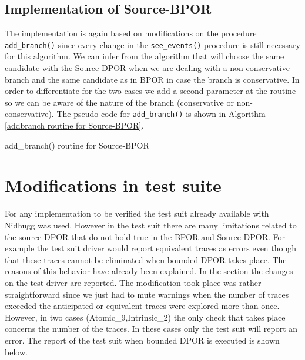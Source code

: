 \subsection{Implementation of Source-BPOR}
The implementation is again based on modifications on the procedure \verb|add_branch()| since every change in the \verb|see_events()| procedure is still necessary for this algorithm.
We can infer from the algorithm that will choose the same candidate with the Source-DPOR when we are dealing with a non-conservative branch and the same candidate as in BPOR
in case the branch is conservative. In order to differentiate for the two cases we add a second parameter at the routine so we can be aware of the nature of the
branch (conservative or non-conservative). The pseudo code for \verb|add_branch()| is shown in Algorithm \ref{addbranch routine for Source-BPOR}.

\begin{algorithm}[H]
    \caption{add\_branch() routine for Source-BPOR}
    \label{addbranch routine for Source-BPOR}
\end{algorithm}

\section{Modifications in test suite}
For any implementation to be verified the test suit already available with Nidhugg was used. However in the test suit there are many limitations related to the source-DPOR
that do not hold true in the BPOR and Source-DPOR. For example the test suit driver would report equivalent traces as errors even though that these traces cannot be eliminated 
when bounded DPOR takes place. The reasons of this behavior have already been explained. In the section the changes on the test driver are reported.
The modification took place was rather straightforward since we just had to mute warnings when the number of traces exceeded the anticipated or equivalent traces were explored more than
once. However, in two cases (Atomic\_9,Intrinsic\_2) the only check that takes place concerns the number of the traces. In these cases only the test suit will report an error. 
The report of the test suit when bounded DPOR is executed is shown below.

